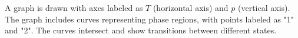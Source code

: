 A graph is drawn with axes labeled as \( T \) (horizontal axis) and \( p \) (vertical axis). The graph includes curves representing phase regions, with points labeled as "1" and "2". The curves intersect and show transitions between different states.